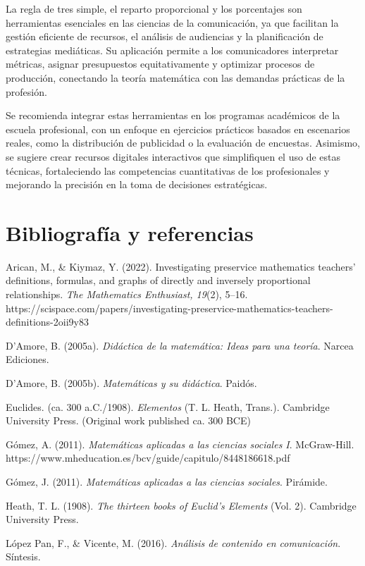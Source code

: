 \documentclass[
  stu,
  floatsintext,
  longtable,
  a4paper,
  nolmodern,
  notxfonts,
  notimes,
  colorlinks=true,linkcolor=blue,citecolor=blue,urlcolor=blue]{apa7}
\begin{document}
La regla de tres simple, el reparto proporcional y los porcentajes son
herramientas esenciales en las ciencias de la comunicación, ya que
facilitan la gestión eficiente de recursos, el análisis de audiencias y
la planificación de estrategias mediáticas. Su aplicación permite a los
comunicadores interpretar métricas, asignar presupuestos equitativamente
y optimizar procesos de producción, conectando la teoría matemática con
las demandas prácticas de la profesión.

Se recomienda integrar estas herramientas en los programas académicos de
la escuela profesional, con un enfoque en ejercicios prácticos basados
en escenarios reales, como la distribución de publicidad o la evaluación
de encuestas. Asimismo, se sugiere crear recursos digitales interactivos
que simplifiquen el uso de estas técnicas, fortaleciendo las
competencias cuantitativas de los profesionales y mejorando la precisión
en la toma de decisiones estratégicas.

\section{Bibliografía y
referencias}\label{bibliografuxeda-y-referencias}

Arican, M., \& Kiymaz, Y. (2022). Investigating preservice mathematics
teachers' definitions, formulas, and graphs of directly and inversely
proportional relationships. \emph{The Mathematics Enthusiast, 19}(2),
5--16.
https://scispace.com/papers/investigating-preservice-mathematics-teachers-definitions-2oii9y83

D'Amore, B. (2005a). \emph{Didáctica de la matemática: Ideas para una
teoría}. Narcea Ediciones.

D'Amore, B. (2005b). \emph{Matemáticas y su didáctica}. Paidós.

Euclides. (ca. 300 a.C./1908). \emph{Elementos} (T. L. Heath, Trans.).
Cambridge University Press. (Original work published ca. 300 BCE)

Gómez, A. (2011). \emph{Matemáticas aplicadas a las ciencias sociales
I}. McGraw-Hill.
https://www.mheducation.es/bcv/guide/capitulo/8448186618.pdf

Gómez, J. (2011). \emph{Matemáticas aplicadas a las ciencias sociales}.
Pirámide.

Heath, T. L. (1908). \emph{The thirteen books of Euclid's Elements}
(Vol. 2). Cambridge University Press.

López Pan, F., \& Vicente, M. (2016). \emph{Análisis de contenido en
comunicación}. Síntesis.
\end{document}

